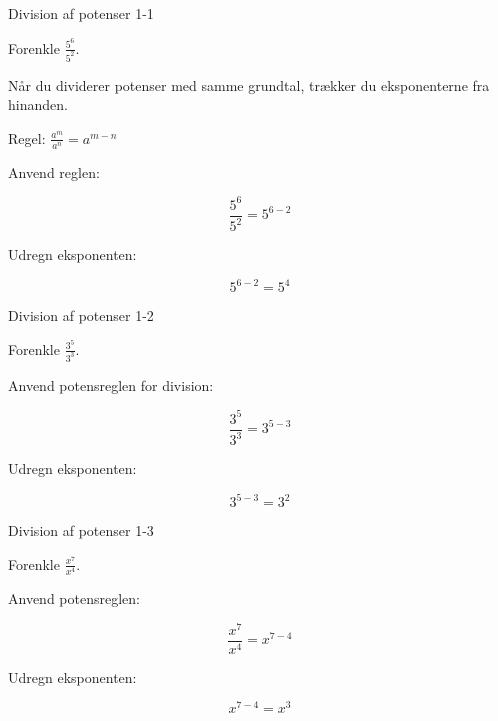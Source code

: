 \documentclass{article}
\begin{document}

\tableofcontents
\newpage

\begin{exercise}{Division af potenser 1-1}

Forenkle $\frac{5^6}{5^2}$.


\hint

Når du dividerer potenser med samme grundtal, trækker du eksponenterne fra hinanden.

\hint

Regel: $\frac{a^m}{a^n} = a^{m-n}$

\hint

Anvend reglen:

\hint
\[
\frac{5^6}{5^2} = 5^{6-2}
\]

\hint

Udregn eksponenten:

\hint
\[
5^{6-2} = 5^4
\]

\end{exercise}

\newpage

\begin{exercise}{Division af potenser 1-2}

Forenkle $\frac{3^5}{3^3}$.


\hint

Anvend potensreglen for division:

\hint
\[
\frac{3^5}{3^3} = 3^{5-3}
\]

\hint

Udregn eksponenten:

\hint
\[
3^{5-3} = 3^2
\]

\end{exercise}

\newpage

\begin{exercise}{Division af potenser 1-3}

Forenkle $\frac{x^7}{x^4}$.


\hint

Anvend potensreglen:

\hint
\[
\frac{x^7}{x^4} = x^{7-4}
\]

\hint

Udregn eksponenten:

\hint
\[
x^{7-4} = x^3
\]

\end{exercise}
\end{document}
